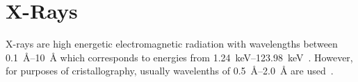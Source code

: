  
\section{X-Rays}\label{sec:Q1}

X-rays are high energetic electromagnetic radiation with wavelengths between \SIrange{0.1}{10}{\angstrom} which corresponds to energies from \SIrange{1.24}{123.98}{\kilo\electronvolt}~\cite{Bohm.2021}. However, for purposes of cristallography, usually wavelenths of \SIrange{0.5}{2.0}{\angstrom} are used~\cite{Schwarzenbach.2001}.



